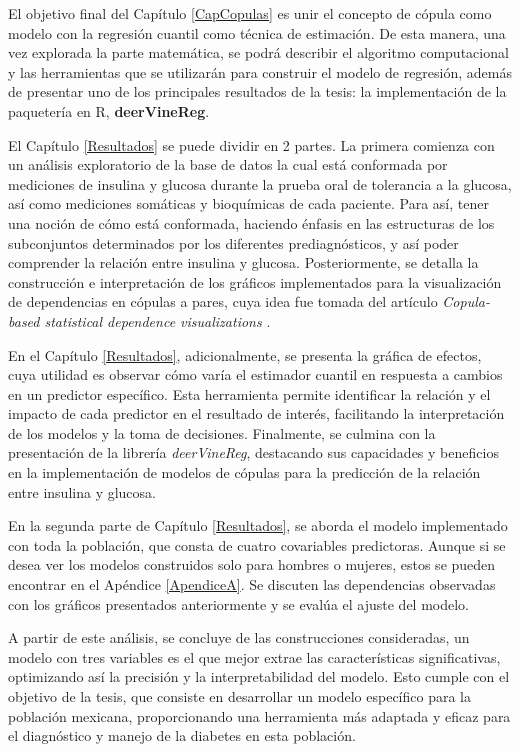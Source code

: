 El objetivo final del Capítulo \ref{CapCopulas} es unir el concepto de cópula como modelo con la regresión cuantil como técnica de estimación. De esta manera, una vez explorada la parte matemática, se podrá describir el algoritmo computacional y las herramientas que se utilizarán para construir el modelo de regresión, además de presentar uno de los principales resultados de la tesis: la implementación de la paquetería en R, \textbf{deerVineReg}.


El Capítulo \ref{Resultados} se puede dividir en 2 partes. La primera comienza con un análisis exploratorio de la base de datos la cual está conformada por mediciones de insulina y glucosa durante la prueba oral de tolerancia a la glucosa, así como mediciones somáticas y bioquímicas de cada paciente. Para así, tener una noción de cómo está conformada, haciendo énfasis en las estructuras de los subconjuntos determinados por los diferentes prediagnósticos, y así poder comprender la relación entre insulina y glucosa. Posteriormente, se detalla la construcción e interpretación de los gráficos implementados para la visualización de dependencias en cópulas a pares, cuya idea fue tomada del artículo \textit{Copula-based statistical dependence visualizations} \cite{Erdely2022}. 

En el Capítulo \ref{Resultados}, adicionalmente, se presenta la gráfica de efectos, cuya utilidad es observar cómo varía el estimador cuantil en respuesta a cambios en un predictor específico. Esta herramienta permite identificar la relación y el impacto de cada predictor en el resultado de interés, facilitando la interpretación de los modelos y la toma de decisiones. Finalmente, se culmina con la presentación de la librería \textit{deerVineReg}, destacando sus capacidades y beneficios en la implementación de modelos de cópulas para la predicción de la relación entre insulina y glucosa.

En la segunda parte de Capítulo \ref{Resultados}, se aborda el modelo implementado con toda la población, que consta de cuatro covariables predictoras. Aunque si se desea ver los modelos construidos solo para hombres o mujeres, estos se pueden encontrar en el Apéndice \ref{ApendiceA}. Se discuten las dependencias observadas con los gráficos presentados anteriormente y se evalúa el ajuste del modelo.

A partir de este análisis, se concluye de las construcciones consideradas, un modelo con tres variables es el que mejor extrae las características significativas, optimizando así la precisión y la interpretabilidad del modelo. Esto cumple con el objetivo de la tesis, que consiste en desarrollar un modelo específico para la población mexicana, proporcionando una herramienta más adaptada y eficaz para el diagnóstico y manejo de la diabetes en esta población.









